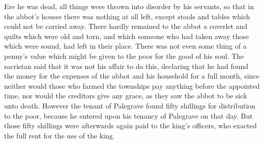 \documentclass{book}
\begin{document}
\begin{paracol}{2}
\switchcolumn

Ere he was dead, all things were thrown into disorder by his servants, so that in the abbot's houses there was nothing at all left, except stools and tables which could not be carried away. There hardly remained to the abbot a coverlet and quilts which were old and torn, and which someone who had taken away those which were sound, had left in their place. There was not even some thing of a penny's value which might be given to the poor for the good of his soul. The sacristan said that it was not his affair to do this, declaring that he had found the money for the expenses of the abbot and his household for a full month, since neither would those who farmed the townships pay anything before the appointed time, nor would the creditors give any grace, as they saw the abbot to be sick unto death. However the tenant of Palegrave found fifty shillings for distribution to the poor, because he entered upon his tenancy of Palegrave on that day. But those fifty shillings were afterwards again paid to the king's officers, who exacted the full rent for the use of the king.

\switchcolumn*


\end{paracol}
\end{document}
